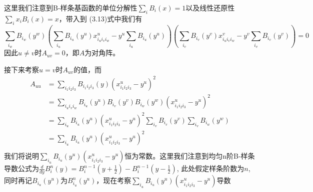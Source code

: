 这里我们注意到B-样条基函数的单位分解性$\sum_i B_i(x) = 1$以及线性还原性$\sum_i x_iB_i(x) = x$，带入到
(3.13)式中我们有
$$\sum_{i_w}B_{i_w}(y^w)(\sum_{i_u}B_{i_u}(y^u)x_{i_u i_v i_w}^u - y^u\sum_{i_u}B_{i_u}(y^u))(\sum_{i_v}B_{i_v}(y^v)x_{i_u i_v i_w}^v - y^v\sum_{i_v}B_{i_v}(y^v)) = 0$$
因此$u\neq v\text{时}A_{uv} = 0$，即$A$为对角阵。

接下来考察$u = v$时$A_{uv}$的值，而
\begin{equation}
    \begin{split}
        A_{uu} &= \sum_{i_1 i_2 i_3} B_{i_1 i_2 i_3}(y) (x_{i_1 i_2 i_3}^u - y^u)^2\\
            &= \sum_{i_u i_v i_w} B_{i_u}(y^u)B_{i_v}(y^v)B_{i_w}(y^w)(x_{i_1 i_2 i_3}^u - y^u)^2\\
            &= \sum_{i_u} B_{i_u}(y^u) (x_{i_1 i_2 i_3}^u - y^u)^2 \sum_{i_v}B_{i_v}(y^v)\sum_{i_v}B_{i_w}(y^w)\\
            &= \sum_{i_u} B_{i_u}(y^u) (x_{i_1 i_2 i_3}^u - y^u)^2\\ 
    \end{split}
\end{equation}
我们将说明$\sum_{i_u} B_{i_u}(y^u)(x_{i_1i_2i_3}^u - y^u)$恒为常数。这里我们注意到均匀n阶B-样条导数公式为$\frac{d}{dy} B_i^n(y) = B_i^{n-1}(y+\frac{1}{2}) - B_i^{n-1}(y - \frac{1}{2})$,
此处假定样条阶数为$n$,同时再记$B_{i_u}(y^u)$为$B_{i_u}^n(y^u)$，现在考察$\sum_{i_u} B_{i_u}(y^u)(x_{i_1i_2i_3}^u - y^u)$导数
